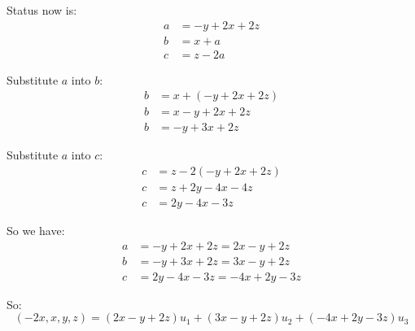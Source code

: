 Status now is:
\begin{align*}
	a & = -y+2x+2z \\
	b & = x+a      \\
	c & = z-2a
\end{align*}

Substitute $a$ into $b$:
\begin{align*}
	b & = x+(-y+2x+2z) \\
	b & = x-y+2x+2z    \\
	b & = -y+3x+2z
\end{align*}

Substitute $a$ into $c$:
\begin{align*}
	c & = z-2(-y+2x+2z) \\
	c & = z+2y-4x-4z    \\
	c & = 2y-4x-3z
\end{align*}

So we have:
\begin{align*}
	a & = -y+2x+2z = 2x-y+2z   \\
	b & = -y+3x+2z = 3x-y+2z   \\
	c & = 2y-4x-3z = -4x+2y-3z
\end{align*}

So:
\[
	(-2x,x,y,z) = (2x-y+2z)u_1 + (3x-y+2z)u_2 + (-4x+2y-3z)u_3
\]


